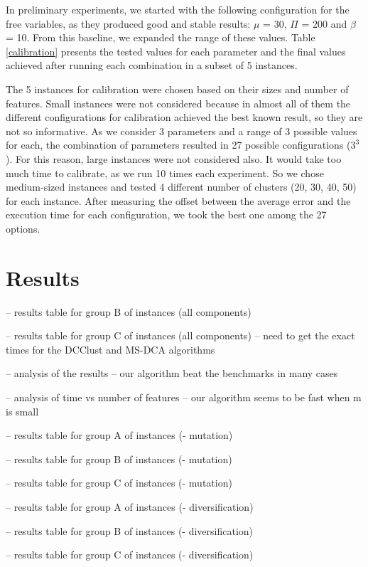 In preliminary experiments, we started with the following configuration for the free variables, as they produced good and stable results: $\mu$ = 30, $\Pi$ = 200 and $\beta$ = 10. From this baseline, we expanded the range of these values. Table \ref{calibration} presents the tested values for each parameter and the final values achieved after running each combination in a subset of 5 instances.

The 5 instances for calibration were chosen based on their sizes and number of features. Small instances were not considered because in almost all of them the different configurations for calibration achieved the best known result, so they are not so informative. As we consider 3 parameters and a range of 3 possible values for each, the combination of parameters resulted in 27 possible configurations ($3^3$). For this reason, large instances were not considered also. It would take too much time to calibrate, as we run 10 times each experiment. So we chose medium-sized instances and tested 4 different number of clusters (20, 30, 40, 50) for each instance. After measuring the offset between the average error and the execution time for each configuration, we took the best one among the 27 options.



\section{Results}

-- results table for group B of instances (all components)

-- results table for group C of instances (all components) -- need to get the exact times for the DCClust and MS-DCA algorithms

-- analysis of the results -- our algorithm beat the benchmarks in many cases

-- analysis of time vs number of features -- our algorithm seems to be fast when m is small

-- results table for group A of instances (- mutation)

-- results table for group B of instances (- mutation)

-- results table for group C of instances (- mutation)

-- results table for group A of instances (- diversification)

-- results table for group B of instances (- diversification)

-- results table for group C of instances (- diversification)

